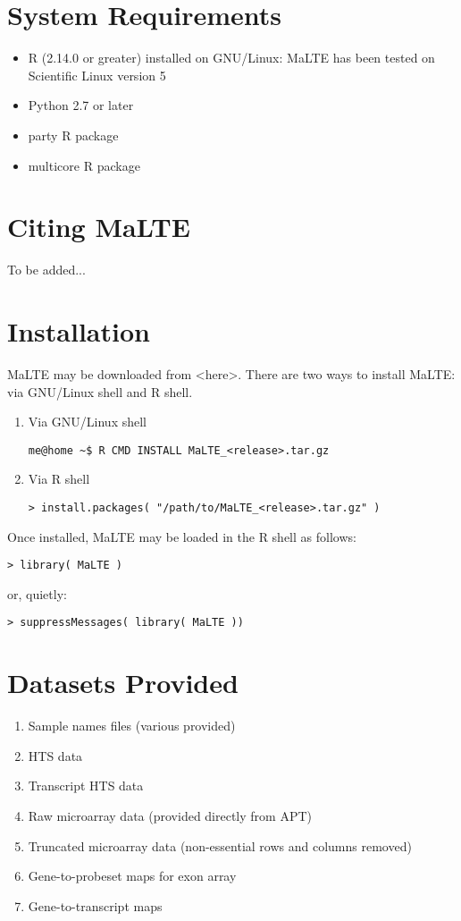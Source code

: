 \documentclass[a4paper,12pt]{article}
\begin{document}
\section{System Requirements}
\begin{itemize}
\item R (2.14.0 or greater) installed on GNU/Linux: MaLTE has been tested on Scientific Linux version 5
\item Python 2.7 or later
\item party \textsf{R} package
\item multicore \textsf{R} package
\end{itemize}

\section{Citing \textsf{MaLTE}}
To be added...


\section{Installation}
MaLTE may be downloaded from \textless here\textgreater. There are two ways to install MaLTE: via GNU/Linux shell and R shell.

\begin{enumerate}
\item Via GNU/Linux shell
\begin{verbatim}
me@home ~$ R CMD INSTALL MaLTE_<release>.tar.gz
\end{verbatim}

\item Via R shell
\begin{verbatim}
> install.packages( "/path/to/MaLTE_<release>.tar.gz" )
\end{verbatim}
\end{enumerate}

Once installed, MaLTE may be loaded in the R shell as follows:
\begin{verbatim}
> library( MaLTE )
\end{verbatim}

or, quietly:

\begin{verbatim}
> suppressMessages( library( MaLTE ))
\end{verbatim}

\section{Datasets Provided}
\begin{enumerate}
\item Sample names files (various provided)
\item HTS data
\item Transcript HTS data
\item Raw microarray data (provided directly from APT)
\item Truncated microarray data (non-essential rows and columns removed)
\item Gene-to-probeset maps for exon array
\item Gene-to-transcript maps
\end{enumerate}
\end{document}
